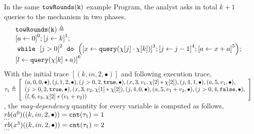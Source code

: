 \begin{example}
    In the same $\mathtt{towRounds(k)}$ example Program,    the analyst asks in total $k+1$ queries to the mechanism in two phases.
    \[         \begin{array}{l}
      \kw{towRounds(k)} \triangleq \\
             \clabel{ \assign{a}{0}}^{0} ;
              \clabel{\assign{j}{k} }^{1} ;\\
              \ewhile ~ \clabel{j > 0}^{2} ~ \edo ~
              \Big(
               \clabel{\assign{x}{\query(\chi[j] \cdot \chi[k])} }^{3}  ;
               \clabel{\assign{j}{j-1}}^{4} ;
              \clabel{\assign{a}{x + a}}^{5}       \Big);\\
              \clabel{\assign{l}{\query(\chi[k]*a)} }^{6}
          \end{array}
          \]    %
    With the initial trace
    $[(k, in, 2, \bullet)]$ and following execution trace, 
    \\
    $
    \trace_1 \triangleq 
    \left[\begin{array}{l}
     (a, 0, 0, \bullet),
    (j, 1, 2, \bullet),
    (j>0, 2, \etrue, \bullet),
    (x, 3, v_1, \chi[2]*\chi[2]),
    (j, 4, 1, \bullet),
    (a, 5, v_1, \bullet),\\
    (j>0, 2, \etrue, \bullet),
    (x, 3, v_2, \chi[1]*\chi[2]),
    (j, 4, 0, \bullet),
    (a, 5, v_1 + v_2, \bullet),
    (j>0, 4, \efalse, \bullet),\\
    (l, 6, v_3, \chi[2]*( v_1 + v_2))
    \end{array} \right]
    $,
    the \emph{may-dependency} quantity for every variable
    is computed as follows,
   \\
   $rb(a^0) ((k, in, 2, \bullet))  = \mathtt{cnt}(\mathtt{\tau}_1) = 1$
   \\
   $\cdots$
  \\
   $rb(x^3) ((k, in, 2, \bullet))  = \mathtt{cnt}(\mathtt{\tau}_1) = 2$
    \\
    $\cdots$
    \\


\end{example}
